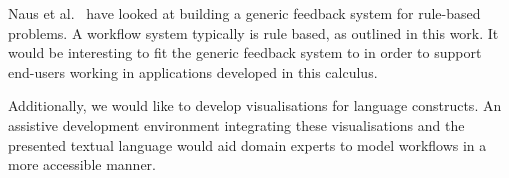 Naus et al.~\cite{UUCS2017013} have looked at building a generic feedback system for rule-based problems.
A workflow system typically is rule based, as outlined in this work.
It would be interesting to fit the generic feedback system to \TOPHAT in order to support end-users working in applications developed in this calculus.

Additionally, we would like to develop visualisations for \TOPHAT language constructs.
An assistive development environment integrating these visualisations and the presented textual language
would aid domain experts to model workflows in a more accessible manner.
